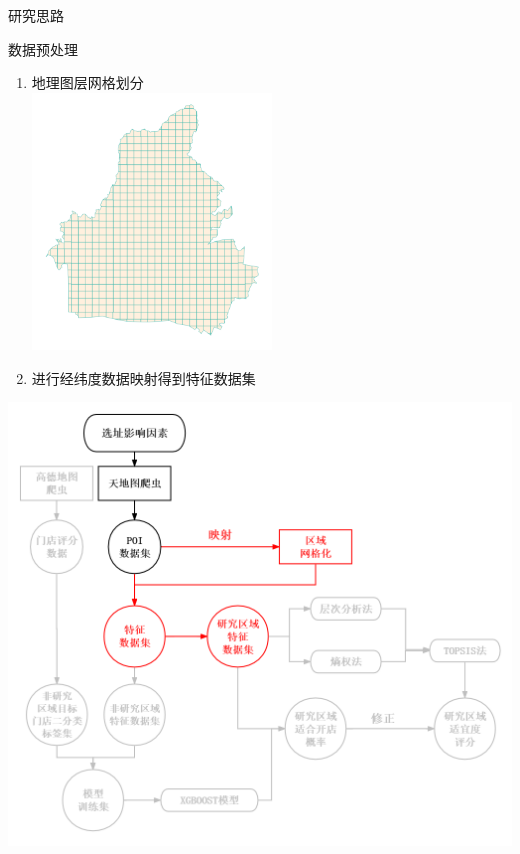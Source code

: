\documentclass{beamer}
\begin{document}
\begin{frame}{研究思路}   
    \begin{minipage}{0.37\textwidth}
        数据预处理
        \begin{enumerate}
            \item 地理图层网格划分 \\
            \includegraphics[width=0.5\textwidth]{pic/tianhegrid.png}
            \item 进行经纬度数据映射得到特征数据集
            
        \end{enumerate}
  
      \end{minipage}
      \hfill
      \begin{minipage}{0.6\textwidth}
        \includegraphics[width=1\textwidth]{pic/3.png}
      \end{minipage}
\end{frame}
\end{document}
